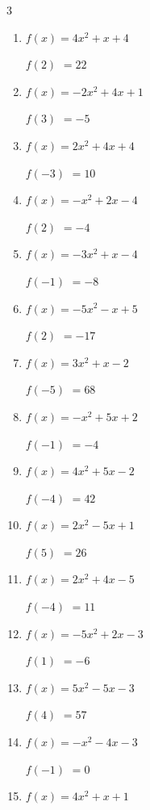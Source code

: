 \begin{multicols}{3}
\begin{enumerate}
$f(4)$
        $= -96$

\columnbreak %

  \item $f(x)=4x^{2}+x+4$

$f(2)$
        $= 22$

  \item $f(x)=-2x^{2}+4x+1$

$f(3)$
        $= -5$

  \item $f(x)=2x^{2}+4x+4$

$f(-3)$
        $= 10$

  \item $f(x)=-x^{2}+2x-4$

$f(2)$
        $= -4$

  \item $f(x)=-3x^{2}+x-4$

$f(-1)$
        $= -8$

  \item $f(x)=-5x^{2}-x+5$

$f(2)$
        $= -17$

  \item $f(x)=3x^{2}+x-2$

$f(-5)$
        $= 68$

  \item $f(x)=-x^{2}+5x+2$

$f(-1)$
        $= -4$

  \item $f(x)=4x^{2}+5x-2$

$f(-4)$
        $= 42$

  \item $f(x)=2x^{2}-5x+1$

$f(5)$
        $= 26$

  \item $f(x)=2x^{2}+4x-5$

$f(-4)$
        $= 11$

  \item $f(x)=-5x^{2}+2x-3$

$f(1)$
        $= -6$

  \item $f(x)=5x^{2}-5x-3$

$f(4)$
        $= 57$

  \item $f(x)=-x^{2}-4x-3$

$f(-1)$
        $= 0$

  \item $f(x)=4x^{2}+x+1$


\end{enumerate}
\end{multicols}
